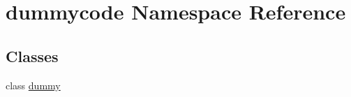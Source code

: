 \section{dummycode Namespace Reference}
\label{namespacedummycode}
\subsection*{Classes}
\begin{DoxyCompactItemize}
\item 
class \hyperlink{classdummycode_1_1dummy}{dummy}
\end{DoxyCompactItemize}
